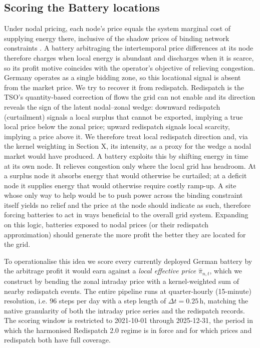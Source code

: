 \subsection{Scoring the Battery locations}
Under nodal pricing, each node's price equals the system marginal cost of supplying energy there, inclusive of the shadow prices of binding network constraints \cite{}. A battery arbitraging the intertemporal price differences at its node therefore charges when local energy is abundant and discharges when it is scarce, so its profit motive coincides with the operator's objective of relieving congestion. Germany operates as a single bidding zone, so this locational signal is absent from the market price. We try to recover it from redispatch. Redispatch is the TSO's quantity-based correction of flows the grid can not enable and its direction reveals the sign of the latent nodal--zonal wedge: downward redispatch (curtailment) signals a local surplus that cannot be exported, implying a true local price below the zonal price; upward redispatch signals local scarcity, implying a price above it. We therefore treat local redispatch direction and, via the kernel weighting in Section X, its intensity, as a proxy for the wedge a nodal market would have produced. A battery exploits this by shifting energy in time at its own node. It relieves congestion only where the local grid has headroom. At a surplus node it absorbs energy that would otherwise be curtailed; at a deficit node it supplies energy that would otherwise require costly ramp-up. A site whose only way to help would be to push power across the binding constraint itself yields no relief and the price at the node should indicate as such, therefore forcing batteries to act in ways beneficial to the overall grid system.
Expanding on this logic, batteries exposed to nodal prices (or their redispatch approximation) should generate the more profit the better they are located for the grid.

To operationalise this idea we score every currently deployed German battery by the arbitrage profit it would earn against a \emph{local effective price} $\hat{\pi}_{n,t}$, which we construct by bending the zonal intraday price with a kernel-weighted sum of nearby redispatch events. The entire pipeline runs at quarter-hourly (15-minute) resolution, i.e. $96$ steps per day with a step length of $\Delta t = 0.25\,\text{h}$, matching the native granularity of both the intraday price series and the redispatch records. The scoring window is restricted to 2021-10-01 through 2025-12-31, the period in which the harmonised Redispatch 2.0 regime is in force and for which prices and redispatch both have full coverage.

